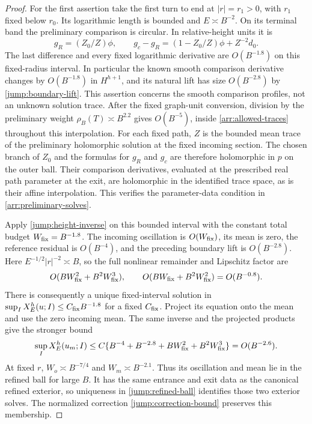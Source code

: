 \begin{proof}
For the first assertion take the first turn to end at
$|r|=r_1>0$, with $r_1$ fixed below $r_0$.  Its logarithmic
length is bounded and $E\asymp B^{-2}$.  On its terminal band the
preliminary comparison is circular.  In relative-height units
it is
\[
 g_R=(Z_0/Z)\phi,\qquad
 g_c-g_R=(1-Z_0/Z)\phi+Z^{-2}d_0.
\]
The last difference and every fixed logarithmic derivative are
$O(B^{-1.8})$ on this fixed-radius interval.  In particular the
known smooth comparison derivative changes by $O(B^{-1.8})$ in
$H^{h+1}$, and its natural lift has size $O(B^{-2.8})$ by
\eqref{jump:boundary-lift}.  This assertion concerns the smooth
comparison profiles, not an unknown solution trace.
After the fixed graph-unit conversion, division by the preliminary
weight $\rho_B(T)\asymp B^{2.2}$ gives $O(B^{-5})$, inside
\eqref{arr:allowed-traces} throughout this interpolation.
For each fixed path, $Z$ is the bounded mean trace of the preliminary
holomorphic solution at the fixed incoming section.  The chosen branch
of $Z_0$ and the formulas for $g_R$ and $g_c$ are therefore holomorphic
in $p$ on the outer ball.  Their comparison derivatives, evaluated at
the prescribed real path parameter at the exit, are holomorphic in the
identified trace space, as is their affine interpolation.  This verifies the
parameter-data condition in \cref{arr:preliminary-solves}.

Apply \cref{jump:height-inverse} on this bounded interval with the
constant total budget $W_{\rm fix}=B^{-1.8}$.  The incoming
oscillation is $O(W_{\rm fix})$, its mean is zero, the reference
residual is $O(B^{-4})$, and the preceding boundary lift is
$O(B^{-2.8})$.  Here $E^{-1/2}|r|^{-2}\asymp B$, so the full
nonlinear remainder and Lipschitz factor are
\[
 O(BW_{\rm fix}^2+B^2W_{\rm fix}^3),\qquad
 O(BW_{\rm fix}+B^2W_{\rm fix}^2)=O(B^{-0.8}).
\]
There is consequently a unique fixed-interval solution in
$\sup_I X_E^h(u;I)\leq C_{\rm fix}B^{-1.8}$ for a fixed
$C_{\rm fix}$.  Project its equation onto the mean and use the
zero incoming mean.  The same inverse and the projected products
give the stronger bound
\[
 \sup_I X_E^h(u_m;I)
 \leq C\{B^{-4}+B^{-2.8}
              +BW_{\rm fix}^2+B^2W_{\rm fix}^3\}
 =O(B^{-2.6}).
\]
At fixed $r$, $W_o\asymp B^{-7/4}$ and
$W_m\asymp B^{-2.1}$.  Thus its oscillation and mean lie in the
refined ball for large $B$.  It has the same entrance and exit
data as the canonical refined exterior, so uniqueness in
\eqref{jump:refined-ball} identifies those two exterior solves.
The normalized correction
\eqref{jump:correction-bound} preserves this membership.


\end{proof}
